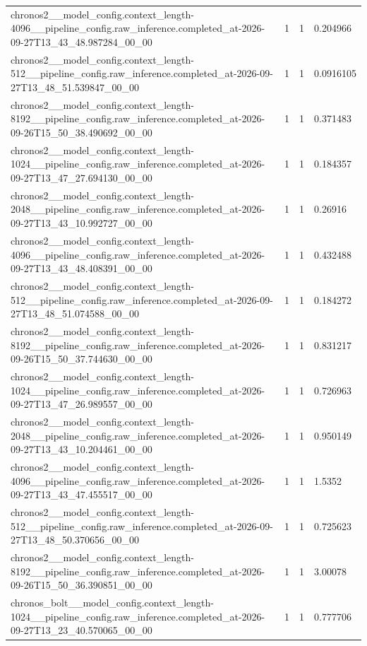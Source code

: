 \begin{tabular}{llll}
chronos2\_\_model\_config.context\_length-4096\_\_pipeline\_config.raw\_inference.completed\_at-2026-09-27T13\_43\_48.987284\_00\_00 & 1 & 1 & 0.204966 \\
chronos2\_\_model\_config.context\_length-512\_\_pipeline\_config.raw\_inference.completed\_at-2026-09-27T13\_48\_51.539847\_00\_00 & 1 & 1 & 0.0916105 \\
chronos2\_\_model\_config.context\_length-8192\_\_pipeline\_config.raw\_inference.completed\_at-2026-09-26T15\_50\_38.490692\_00\_00 & 1 & 1 & 0.371483 \\
chronos2\_\_model\_config.context\_length-1024\_\_pipeline\_config.raw\_inference.completed\_at-2026-09-27T13\_47\_27.694130\_00\_00 & 1 & 1 & 0.184357 \\
chronos2\_\_model\_config.context\_length-2048\_\_pipeline\_config.raw\_inference.completed\_at-2026-09-27T13\_43\_10.992727\_00\_00 & 1 & 1 & 0.26916 \\
chronos2\_\_model\_config.context\_length-4096\_\_pipeline\_config.raw\_inference.completed\_at-2026-09-27T13\_43\_48.408391\_00\_00 & 1 & 1 & 0.432488 \\
chronos2\_\_model\_config.context\_length-512\_\_pipeline\_config.raw\_inference.completed\_at-2026-09-27T13\_48\_51.074588\_00\_00 & 1 & 1 & 0.184272 \\
chronos2\_\_model\_config.context\_length-8192\_\_pipeline\_config.raw\_inference.completed\_at-2026-09-26T15\_50\_37.744630\_00\_00 & 1 & 1 & 0.831217 \\
chronos2\_\_model\_config.context\_length-1024\_\_pipeline\_config.raw\_inference.completed\_at-2026-09-27T13\_47\_26.989557\_00\_00 & 1 & 1 & 0.726963 \\
chronos2\_\_model\_config.context\_length-2048\_\_pipeline\_config.raw\_inference.completed\_at-2026-09-27T13\_43\_10.204461\_00\_00 & 1 & 1 & 0.950149 \\
chronos2\_\_model\_config.context\_length-4096\_\_pipeline\_config.raw\_inference.completed\_at-2026-09-27T13\_43\_47.455517\_00\_00 & 1 & 1 & 1.5352 \\
chronos2\_\_model\_config.context\_length-512\_\_pipeline\_config.raw\_inference.completed\_at-2026-09-27T13\_48\_50.370656\_00\_00 & 1 & 1 & 0.725623 \\
chronos2\_\_model\_config.context\_length-8192\_\_pipeline\_config.raw\_inference.completed\_at-2026-09-26T15\_50\_36.390851\_00\_00 & 1 & 1 & 3.00078 \\
chronos\_bolt\_\_model\_config.context\_length-1024\_\_pipeline\_config.raw\_inference.completed\_at-2026-09-27T13\_23\_40.570065\_00\_00 & 1 & 1 & 0.777706 \\

\end{tabular}
